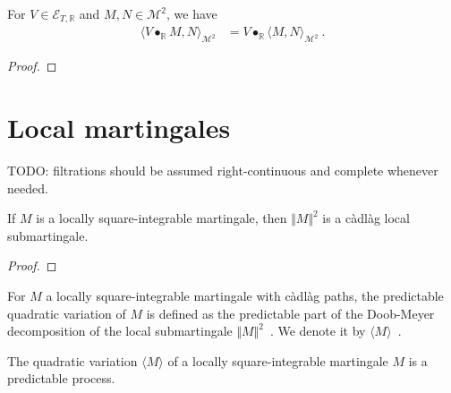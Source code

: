 \begin{lemma}\label{lem:inner_elemStochIntegral}
For $V \in \mathcal{E}_{T, \mathbb{R}}$ and $M, N \in \mathcal{M}^2$, we have
\begin{align*}
  \langle V \bullet_{\mathbb{R}} M, N \rangle_{\mathcal{M}^2}
  &= V \bullet_{\mathbb{R}} \langle M, N \rangle_{\mathcal{M}^2}
  \: .
\end{align*}
\end{lemma}

\begin{proof}

\end{proof}





\section{Local martingales}

TODO: filtrations should be assumed right-continuous and complete whenever needed.


\begin{lemma}\label{lem:IsLocallySquareIntegrable.isLocalSubmartingale_sq_norm}
  \leanok
If $M$ is a locally square-integrable martingale, then $\Vert M \Vert^2$ is a càdlàg local
submartingale.
\end{lemma}

\begin{proof}

\end{proof}


\begin{definition}\label{def:quadraticVariation}
  \leanok
For $M$ a locally square-integrable martingale with càdlàg paths, the predictable
quadratic variation of $M$ is defined as the predictable part of the Doob-Meyer decomposition of
the local submartingale $\Vert M \Vert^2$~.
We denote it by $\langle M \rangle$~.
\end{definition}


\begin{lemma}\label{lem:predictable_quadraticVariation}
The quadratic variation $\langle M \rangle$ of a locally square-integrable martingale $M$ is a
predictable process.
\end{lemma}


